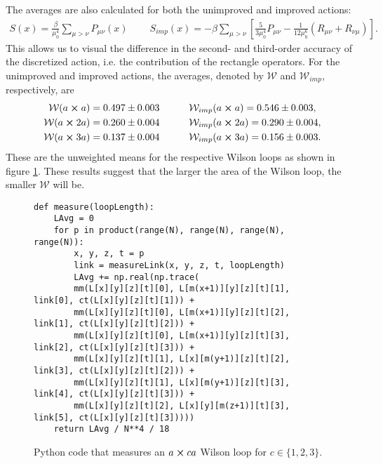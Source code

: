 \documentclass[11pt]{article}
\begin{document}
The averages are also calculated for both the unimproved and improved actions:
\begin{align}
	S(x)=\frac{\beta}{\mu_0^4}\sum_{\mu>\nu}P_{\mu\nu}(x)\qquad\ S_{imp}(x)=-\beta\sum_{\mu>\nu}\left[\frac{5}{3\mu_0^4}P_{\mu\nu}-\frac{1}{12\mu_0^6}(R_{\mu\nu}+R_{\nu\mu})\right].
	\label{eq:ActAgain}
\end{align}
This allows us to visual the difference in the second- and third-order accuracy of the discretized action, i.e. the contribution of the rectangle operators. For the unimproved and improved actions, the averages, denoted by $\mathcal{W}$ and $\mathcal{W}_{imp}$, respectively, are
\begin{align}
\begin{split}
	\mathcal{W}(a\cross a)=0.497\pm0.003\qquad\quad&\mathcal{W}_{imp}(a\cross a)=0.546\pm0.003,\\
	\mathcal{W}(a\cross2a)=0.260\pm0.004\qquad\quad&\mathcal{W}_{imp}(a\cross2a)=0.290\pm0.004,\\
	\mathcal{W}(a\cross3a)=0.137\pm0.004\qquad\quad&\mathcal{W}_{imp}(a\cross3a)=0.156\pm0.003.
\end{split}
\end{align}
These are the unweighted means for the respective Wilson loops as shown in figure \ref{fig:LQCDMCCode}. These results suggest that the larger the area of the Wilson loop, the smaller $\mathcal{W}$ will be.
\begin{figure}[h!]
\begin{lstlisting}
def measure(loopLength):
    LAvg = 0
    for p in product(range(N), range(N), range(N), range(N)):
        x, y, z, t = p
        link = measureLink(x, y, z, t, loopLength)
        LAvg += np.real(np.trace( 
        mm(L[x][y][z][t][0], L[m(x+1)][y][z][t][1], link[0], ct(L[x][y][z][t][1])) + 
        mm(L[x][y][z][t][0], L[m(x+1)][y][z][t][2], link[1], ct(L[x][y][z][t][2])) + 
        mm(L[x][y][z][t][0], L[m(x+1)][y][z][t][3], link[2], ct(L[x][y][z][t][3])) + 
        mm(L[x][y][z][t][1], L[x][m(y+1)][z][t][2], link[3], ct(L[x][y][z][t][2])) + 
        mm(L[x][y][z][t][1], L[x][m(y+1)][z][t][3], link[4], ct(L[x][y][z][t][3])) + 
        mm(L[x][y][z][t][2], L[x][y][m(z+1)][t][3], link[5], ct(L[x][y][z][t][3]))))
    return LAvg / N**4 / 18
\end{lstlisting}
	\caption{Python code that measures an $a\cross ca$ Wilson loop for $c\in\{1,2,3\}$.}%
	\label{fig:LQCDMCCode}
\end{figure}
\end{document}
